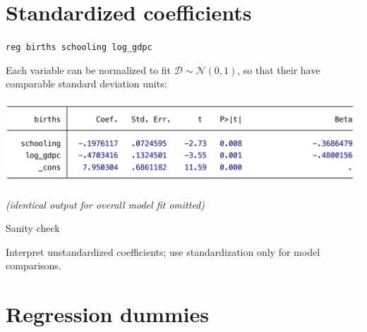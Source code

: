 \documentclass[t]{beamer}
\begin{document}
		\section{Standardized coefficients}

	\begin{frame}[t]{\texttt{reg births schooling log\_gdpc}}

		Each variable can be normalized to fit $\mathcal{D} \sim \mathcal{N}(0,1)$, so that their  have comparable standard deviation units:
		
		\includegraphics[scale=.45]{mreg-output-beta.pdf}

		\footnotesize{\textit{(identical output for overall model fit omitted)}}
		
		\begin{alertblock}{Sanity check}

			Interpret unstandardized coefficients; use standardization only for model comparisons.

		\end{alertblock}

	\end{frame}

		\section{Regression dummies}
\end{document}
